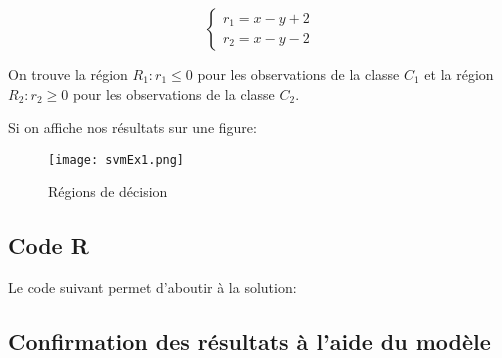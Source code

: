 \documentclass{article}
\begin{document}
\begin{multicols}{2}
$$
\begin{cases}
    r_1 = x - y + 2 \\
    r_2 = x - y - 2
\end{cases}
$$

On trouve la région $R_1 : r_1 \leq 0$ pour les observations de la classe $C_1$
et la région $R_2: r_2 \geq 0$ pour les observations de la classe $C_2$.

Si on affiche nos résultats sur une figure:

\begin{figure}[H]
    \begin{center}
        \texttt{[image: svmEx1.png]}
        \centering
        \captionsetup{justification=centering}
        \caption{\label{fig:ex1}Régions de décision}
    \end{center}
\end{figure}

\subsection{Code R}\label{subsec:ex14}

Le code suivant permet d'aboutir à la solution:



\subsection{Confirmation des résultats à l'aide du modèle}\label{subsec:ex15}


\end{multicols}
\end{document}
